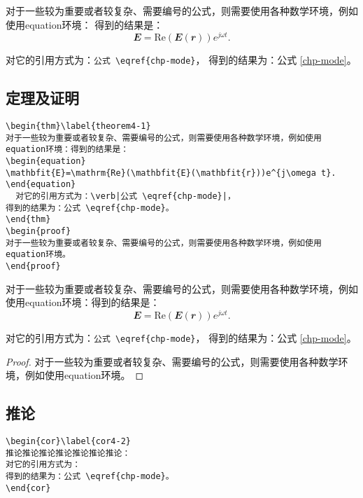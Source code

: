 \begin{defn}\label{defn4-1}
对于一些较为重要或者较复杂、需要编号的公式，则需要使用各种数学环境，例如使用equation环境：
得到的结果是：
\begin{equation}
\mathbfit{E}=\mathrm{Re}(\mathbfit{E}(\mathbfit{r}))e^{j\omega t}.
\end{equation}

对它的引用方式为：\verb|公式 \eqref{chp-mode}|，
得到的结果为：公式 \eqref{chp-mode}。
\end{defn}

\subsection{定理及证明}\label{thm}
\begin{verbatim}
\begin{thm}\label{theorem4-1}
对于一些较为重要或者较复杂、需要编号的公式，则需要使用各种数学环境，例如使用equation环境：得到的结果是：
\begin{equation}
\mathbfit{E}=\mathrm{Re}(\mathbfit{E}(\mathbfit{r}))e^{j\omega t}.
\end{equation}
  对它的引用方式为：\verb|公式 \eqref{chp-mode}|，
得到的结果为：公式 \eqref{chp-mode}。
\end{thm}
\begin{proof}
对于一些较为重要或者较复杂、需要编号的公式，则需要使用各种数学环境，例如使用equation环境。
\end{proof}
\end{verbatim}

\begin{thm}\label{theorem4-1}
对于一些较为重要或者较复杂、需要编号的公式，则需要使用各种数学环境，例如使用equation环境：得到的结果是：
\begin{equation}
\mathbfit{E}=\mathrm{Re}(\mathbfit{E}(\mathbfit{r}))e^{j\omega t}.
\end{equation}

对它的引用方式为：\verb|公式 \eqref{chp-mode}|，
得到的结果为：公式 \eqref{chp-mode}。
\end{thm}
\begin{proof}
对于一些较为重要或者较复杂、需要编号的公式，则需要使用各种数学环境，例如使用equation环境。
\end{proof}

\subsection{推论}\label{cor}
\begin{verbatim}
\begin{cor}\label{cor4-2}
推论推论推论推论推论推论推论：
对它的引用方式为：
得到的结果为：公式 \eqref{chp-mode}。
\end{cor}
\end{verbatim}

